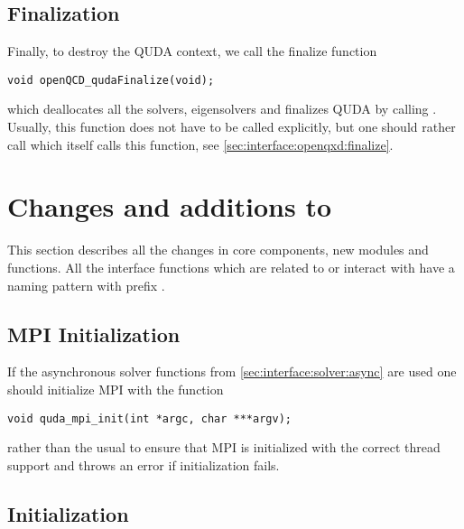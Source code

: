 \subsection{Finalization}
\label{sec:interface:quda:finalize}


Finally, to destroy the QUDA context, we call the finalize function
\begin{verbatim}
void openQCD_qudaFinalize(void);
\end{verbatim}
which deallocates all the solvers, eigensolvers and finalizes QUDA by calling . Usually, this function does not have to be called explicitly, but one should rather call  which itself calls this function, see \cref{sec:interface:openqxd:finalize}.

\section{Changes and additions to \openqxd}
\label{sec:interface:openqxd}

This section describes all the changes in \openqxd core components, new modules and functions.
All the interface functions which are related to or interact with \quda have a naming pattern with prefix .

\subsection{MPI Initialization}
\label{sec:interface:openqxd:mpi:init}


If the asynchronous solver functions from \cref{sec:interface:solver:async} are used one should initialize MPI with the function
\begin{verbatim}
void quda_mpi_init(int *argc, char ***argv);
\end{verbatim}
rather than the usual  to ensure that MPI is initialized with the correct thread support and throws an error if initialization fails.

\subsection{\Quda Initialization}
\label{sec:interface:openqxd:init}

